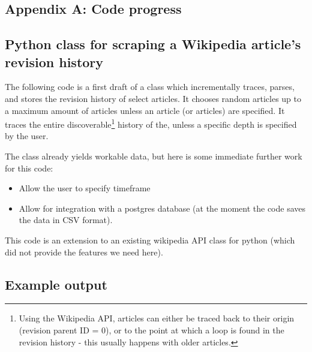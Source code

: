 \documentclass[a4paper,11pt,twoside,notitlepage]{article}
\begin{document}
        
        \clearpage
        \printbibheading[heading=bibintoc,title={References}]
        \printbibliography[keyword=wiki,heading=subbibliography,title={Wikipedia}]
        \printbibliography[keyword=edit,heading=subbibliography,title={Edit
            distance}]
        
        
        \clearpage
        \begin{appendices}
          \section{Appendix A: Code progress}
          \subsection{Python class for scraping a Wikipedia article's
            revision history}
          \label{wiki-scrape}
          The following code is a first draft of a class which incrementally
          traces, parses, and stores the revision history of select articles. It
          chooses random articles up to a maximum amount of articles unless an
          article (or articles) are specified. It traces the entire
          discoverable\footnote{Using the Wikipedia API, articles can either be
            traced back to their origin (revision parent ID = 0), or to the
            point at which a loop is found in the revision history - this
            usually happens with older articles.} history of the, unless a
          specific depth is specified by the user.
          
          The class already yields workable data, but here is some immediate
          further work for this code:
          \begin{itemize}
          \item Allow the user to specify timeframe
          \item Allow for integration with a postgres database (at the moment
            the code saves the data in CSV format).
          \end{itemize}
          
          This code is an extension to an existing wikipedia API class for
          python (which did not provide the features we need
          here).\cite{python-wikipedia}
          
          
          \subsection{Example output}
          

\end{appendices}
\end{document}
